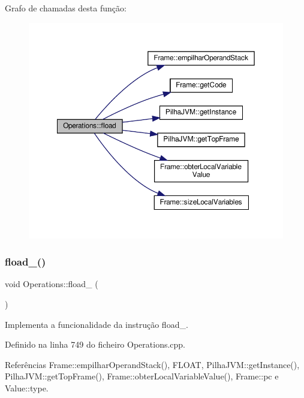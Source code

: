 Grafo de chamadas desta função\+:
\nopagebreak
\begin{figure}[H]
\begin{center}
\leavevmode
\includegraphics[width=350pt]{classOperations_af6204248b38b7e6af3a4a6d0f805d79f_cgraph}
\end{center}
\end{figure}
\mbox{\label{classOperations_a844c8a8d812c4f78c8f1024bbdac0548}} 
\subsubsection{\texorpdfstring{fload\+\_()}{fload\_0()}}
{\footnotesize\ttfamily void Operations\+::fload\+\_ (\begin{DoxyParamCaption}{ }\end{DoxyParamCaption})\hspace{0.3cm}{\ttfamily [private]}}



Implementa a funcionalidade da instrução fload\+\_. 



Definido na linha 749 do ficheiro Operations.\+cpp.



Referências Frame\+::empilhar\+Operand\+Stack(), F\+L\+O\+AT, Pilha\+J\+V\+M\+::get\+Instance(), Pilha\+J\+V\+M\+::get\+Top\+Frame(), Frame\+::obter\+Local\+Variable\+Value(), Frame\+::pc e Value\+::type.



